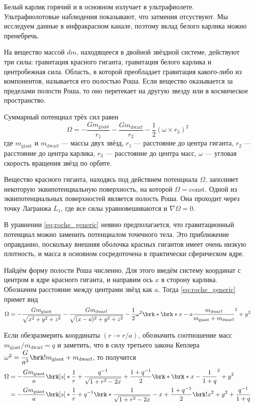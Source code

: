 Белый карлик горячий и в основном излучает в ультрафиолете. Ультрафиолотовые наблюдения показывают, что затмения отсуствуют. Мы исследуем данные в инфракрасном канале, поэтому вклад белого карлика можно пренебречь.


На вещество массой $dm$, находящееся в двойной звёздной системе, действуют три силы: гравитация красного гиганта, гравитация белого карлика и центробежная сила. Область, в которой преобладает гравитация какого-либо из компонентов, называется его полостью Роша. Если вещество оказывается за пределами полости Роша, то оно перетекает на другую звезду или в космическое пространство.

Суммарный потенциал трёх сил равен
\begin{equation}
\Omega = 
-\frac{G m_\text{giant}}{r_1}
-\frac{G m_\text{dwarf}}{r_2}
-\frac{1}{2} (\omega \times r_3)^2
\label{eq:roche_generic}
\end{equation}
где $m_\text{giant}$ и $m_\text{dwarf}$ --- массы двух звёзд, $r_1$ --- расстояние до центра гиганта, $r_2$ --- расстояние до центра карлика, $r_3$ --- расстояние до центра масс, $\omega$ --- угловая скорость вращения звёзд по орбите.

Вещество красного гиганта, находясь под действием потенциала $\Omega$, заполняет некоторую эквипотенциальную поверхность, на которой $\Omega = \text{const}$. Одной из эквипотенциальных поверхностей является полость Роша. Она проходит через точку Лагранжа $L_1$, где все силы уравновешиваются и $\nabla \Omega = 0$.

В уравнении \eqref{eq:roche_generic} неявно предполагается, что гравитационный потенциал можно заменить потенциалом точечного тела. Это приближение оправданно, поскольку внешняя оболочка красных гигантов имеет очень низкую плотность, и масса в основном сосредоточена в практически сферическом ядре.

Найдём форму полости Роша численно. Для этого введём систему координат с центром в ядре красного гиганта, и направим ось $x$ в сторону карлика. Обозначим расстояние между центрами звёзд как $a$. Тогда \eqref{eq:roche_generic} примет вид
\[
\Omega =
-\frac{G m_\text{giant}}{\sqrt{x^2 + y^2 + z^2}}
-\frac{G m_\text{dwarf}}{\sqrt{(x - a)^2 + y^2 + z^2}}
-\frac{1}{2} \omega^2 \brk*{\brk*{x - a \frac{m_\text{dwarf}}{m_\text{giant} + m_\text{dwarf}}}^2 + y^2}
\]

Если обезразмерить координаты $(r \to r / a)$, обозначить соотношение масс $m_\text{giant} / m_\text{dwarf} = q$ и заметить, что в силу третьего закона Кеплера $\omega^2 = \dfrac{G}{a^3} \brk!{m_\text{giant} + m_\text{dwarf}}$, то получится
\begin{align*}
\Omega 
&= - \frac{G m_\text{giant}}{a} \brk[s]*{
    \frac{1}{r}
    + \frac{q^{-1}}{\sqrt{1 + r^2 - 2x}}
    + \frac{1 + q^{-1}}{2} \brk*{\brk*{x - \frac{1}{1+q}}^2 + y^2}
} \\
&= - \frac{G m_\text{giant}}{a} \brk[s]*{
    \frac{1}{r}
    + q^{-1} \brk*{
        \frac{1}{\sqrt{1 + r^2 - 2x}} - x
    }
    + \frac{1 + q^{-1}}{2} \brk!{x^2 + y^2}
    + \frac{q^{-1}}{1 + q}
}
\end{align*}

